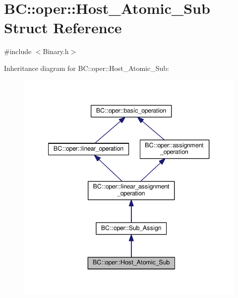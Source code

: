 \hypertarget{structBC_1_1oper_1_1Host__Atomic__Sub}{}\section{BC\+:\+:oper\+:\+:Host\+\_\+\+Atomic\+\_\+\+Sub Struct Reference}
\label{structBC_1_1oper_1_1Host__Atomic__Sub}


{\ttfamily \#include $<$Binary.\+h$>$}



Inheritance diagram for BC\+:\+:oper\+:\+:Host\+\_\+\+Atomic\+\_\+\+Sub\+:
\nopagebreak
\begin{figure}[H]
\begin{center}
\leavevmode
\includegraphics[width=340pt]{structBC_1_1oper_1_1Host__Atomic__Sub__inherit__graph}
\end{center}
\end{figure}


